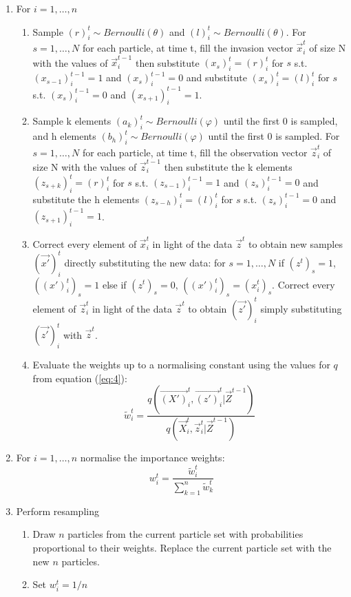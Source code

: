 \begin{algorithm}[H]
\begin{algorithmic}
\begin{enumerate}
	\item For $i = 1, \dots , n$
	\begin{enumerate}
  		\item Sample $(r)^t_i \sim Bernoulli(\theta)$ and $(l)^t_i \sim Bernoulli(\theta)$. For $s = 1, \dots, N$ for each particle, at time t, fill the invasion vector $\vec{x}_i^t$ of size N with the values of $\vec{x}_i^{t-1}$ then substitute $(x_s)^t_i = (r)^t_i$ for $s$ s.t. $(x_{s-1})^{t-1}_i = 1$ and $(x_s)^{t-1}_i = 0$ and substitute $(x_s)^t_i = (l)^t_i$ for $s$ s.t. $(x_s)^{t-1}_i = 0$ and $(x_{s+1})^{t-1}_i = 1$.
  		\item Sample k elements $(a_k)^t_i \sim Bernoulli(\varphi)$ until the first 0 is sampled, and h elements $(b_h)^t_i \sim Bernoulli(\varphi)$ until the first 0 is sampled. For $s = 1, \dots, N$ for each particle, at time t, fill the observation vector $\vec{z}_i^t$ of size N with the values of $\vec{z}_i^{t-1}$ then substitute the k elements $(z_{s+k})^t_i = (r)^t_i$ for $s$ s.t. $(z_{s-1})^{t-1}_i = 1$ and $(z_s)^{t-1}_i = 0$ and substitute the h elements $(z_{s-h})^t_i = (l)^t_i$ for $s$ s.t. $(z_s)^{t-1}_i = 0$ and $(z_{s+1})^{t-1}_i = 1$.
		\item Correct every element of $\vec{x}^t_i$ in light of the data $\vec{z}^t$ to obtain new samples $(\vec{x'})^t_i$ directly substituting the new data: for $s = 1, \dots ,N$ if $(z^t)_s = 1$, $((x')_i^t)_s = 1$ else if $(z^t)_s = 0$, $((x')_i^t)_s = (x^t_i)_s$. Correct every element of $\vec{z}^t_i$ in light of the data $\vec{z}^t$ to obtain $(\vec{z'})^t_i$ simply substituting $(\vec{z'})^t_i$ with $\vec{z}^t$.
		\item Evaluate the weights up to a normalising constant using the values for $q$ from equation (\ref{eq:4}):
		\[
		\tilde{w}^{t}_{i} = \frac{q(\vec{(X')}^{t}_i, \vec{(z')}^{t}_i | \vec{Z}^{t-1})}{q(\vec{X}^{t}_i, \vec{z}^{t}_i | \vec{Z}^{t-1})}
		\]
	\end{enumerate}
	\item For $i = 1, \dots , n$ normalise the importance weights:
	\[
	w^{t}_{i} = \frac{\tilde{w}^t_i}{\sum_{k=1}^{n}\tilde{w}^{t}_k}
	\]
	\item Perform resampling
	\begin{enumerate}
	    \item Draw $n$ particles from the current particle set with probabilities proportional to their weights. Replace the current particle set with the new $n$ particles.
	    \item Set $w^t_i=1/n$
	\end{enumerate}
\end{enumerate}
  
 \end{algorithmic}
\end{algorithm}




